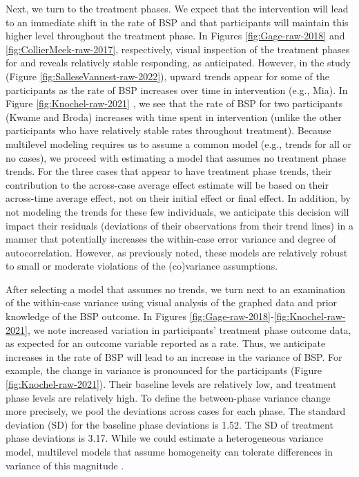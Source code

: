\documentclass[
]{book}
\begin{document}
Next, we turn to the treatment phases. We expect that the intervention will lead to an immediate shift in the rate of BSP and that participants will maintain this higher level throughout the treatment phase. In Figures \ref{fig:Gage-raw-2018} and \ref{fig:CollierMeek-raw-2017}, respectively, visual inspection of the treatment phases for \citet{Gage2018} and \citet{CollierMeek2017} reveals relatively stable responding, as anticipated. However, in the \citet{Sallese_Vannest_2022} study (Figure \ref{fig:SalleseVannest-raw-2022}), upward trends appear for some of the participants as the rate of BSP increases over time in intervention (e.g., Mia). In Figure \ref{fig:Knochel-raw-2021} \citep{knochel2021culturally}, we see that the rate of BSP for two participants (Kwame and Broda) increases with time spent in intervention (unlike the other participants who have relatively stable rates throughout treatment). Because multilevel modeling requires us to assume a common model (e.g., trends for all or no cases), we proceed with estimating a model that assumes no treatment phase trends. For the three cases that appear to have treatment phase trends, their contribution to the across-case average effect estimate will be based on their across-time average effect, not on their initial effect or final effect. In addition, by not modeling the trends for these few individuals, we anticipate this decision will impact their residuals (deviations of their observations from their trend lines) in a manner that potentially increases the within-case error variance and degree of autocorrelation. However, as previously noted, these models are relatively robust to small or moderate violations of the (co)variance assumptions.

After selecting a model that assumes no trends, we turn next to an examination of the within-case variance using visual analysis of the graphed data and prior knowledge of the BSP outcome. In Figures \ref{fig:Gage-raw-2018}-\ref{fig:Knochel-raw-2021}, we note increased variation in participants' treatment phase outcome data, as expected for an outcome variable reported as a rate. Thus, we anticipate increases in the rate of BSP will lead to an increase in the variance of BSP. For example, the change in variance is pronounced for the \citet{knochel2021culturally} participants (Figure \ref{fig:Knochel-raw-2021}). Their baseline levels are relatively low, and treatment phase levels are relatively high. To define the between-phase variance change more precisely, we pool the deviations across cases for each phase. The standard deviation (SD) for the baseline phase deviations is 1.52. The SD of treatment phase deviations is 3.17. While we could estimate a heterogeneous variance model, multilevel models that assume homogeneity can tolerate differences in variance of this magnitude \citep{Joo_et_al_2019}.
\end{document}
